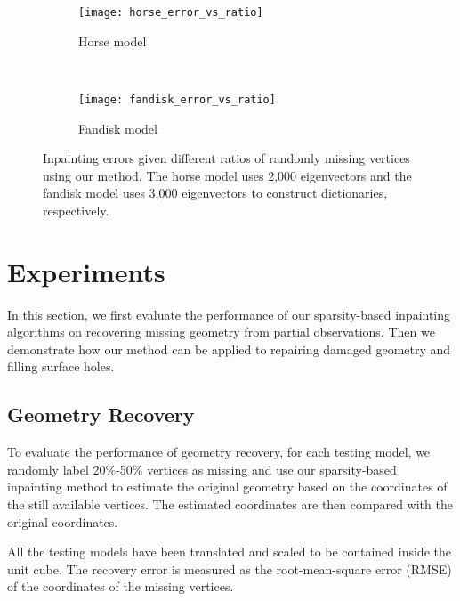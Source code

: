 \begin{figure}
    \centering
    \begin{subfigure}[b]{0.45\linewidth}
        \texttt{[image: horse\_error\_vs\_ratio]}
        \caption{Horse model}
    \end{subfigure}%
    ~
    \begin{subfigure}[b]{0.45\linewidth}
        \texttt{[image: fandisk\_error\_vs\_ratio]}
        \caption{Fandisk model}
    \end{subfigure}
    \caption[Inpainting errors given different ratios of randomly missing vertices.]
    {Inpainting errors given different ratios of randomly missing vertices using our method. 
    The horse model uses 2,000 eigenvectors and the fandisk model uses 3,000 eigenvectors to
    construct dictionaries, respectively.}
\label{fig:error_vs_ratio}
\end{figure}

\section{Experiments}
In this section, we first evaluate the performance of our sparsity-based
inpainting algorithms on recovering missing geometry from partial observations.
Then we demonstrate how our method can be applied to repairing damaged geometry
and filling surface holes.

\subsection{Geometry Recovery}
To evaluate the performance of geometry recovery, for each testing model, we
randomly label 20\%-50\% vertices as missing and use our sparsity-based
inpainting method to estimate the original geometry based on the coordinates of
the still available vertices. The estimated coordinates are then compared with
the original coordinates.

All the testing models have been translated and scaled to be contained inside
the unit cube. The recovery error is measured as the
root-mean-square error (RMSE) of the coordinates of the missing vertices.


